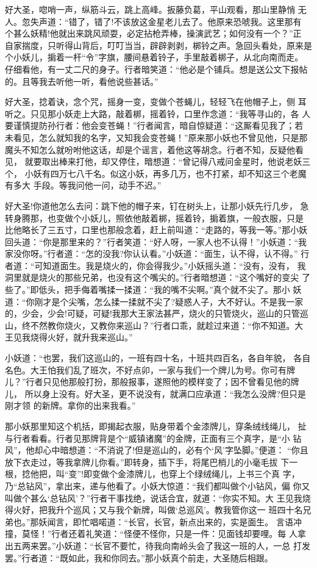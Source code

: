 好大圣，唿哨一声，纵筋斗云，跳上高峰。扳藤负葛，平山观看，那山里静悄
无人。忽失声道：“错了，错了!不该放这金星老儿去了。他原来恐唬我。这里那有
个甚么妖精!他就出来跳风顽耍，必定拈枪弄棒，操演武艺；如何没有一个？”正
自家揣度，只听得山背后，叮叮当当，辟辟剥剥，梆铃之声。急回头看处，原来是
个小妖儿，掮着一杆“令”字旗，腰间悬着铃子，手里敲着梆子，从北向南而走。
仔细看他，有一丈二尺的身子。行者暗笑道：“他必是个铺兵。想是送公文下报帖
的。且等我去听他一听，看他说些甚话。”

好大圣，捻着诀，念个咒，摇身一变，变做个苍蝇儿，轻轻飞在他帽子上，侧
耳听之。只见那小妖走上大路，敲着梆，摇着铃，口里作念道：“我等寻山的，各
人要谨慎提防孙行者：他会变苍蝇！”行者闻言，暗自惊疑道：“这厮看见我了；若
未看见，怎么就知我的名字，又知我会变苍蝇！”原来那小妖也不曾见他，只是那
魔头不知怎么就吩咐他这话，却是个谣言，着他这等胡念。行者不知，反疑他看见，
就要取出棒来打他，却又停住，暗想道：“曾记得八戒问金星时，他说老妖三个，
小妖有四万七八千名。似这小妖，再多几万，也不打紧，却不知这三个老魔有多大
手段。等我问他一问，动手不迟。”

好大圣!你道他怎么去问：跳下他的帽子来，钉在树头上，让那小妖先行几步，
急转身腾那，也变做个小妖儿，照依他敲着梆，摇着铃，掮着旗，一般衣服，只是
比他略长了三五寸，口里也那般念着，赶上前叫道：“走路的，等我一等。”那小妖
回头道：“你是那里来的？”行者笑道：“好人呀，一家人也不认得！”小妖道：“我
家没你呀。”行者道：“怎的没我?你认认看。”小妖道：“面生，认不得，认不得。”
行者道：“可知道面生。我是烧火的，你会得我少。”小妖摇头道：“没有，没有，
我洞里就是烧火的那些兄弟，也没有这个嘴尖的。”行者暗想道：“这个嘴好的变尖
了些了。”即低头，把手侮着嘴揉一揉道：“我的嘴不尖啊。”真个就不尖了。那小
妖道：“你刚才是个尖嘴，怎么揉一揉就不尖了?疑惑人子，大不好认。不是我一家
的，少会，少会!可疑，可疑!我那大王家法甚严，烧火的只管烧火，巡山的只管巡
山，终不然教你烧火，又教你来巡山？”行者口乖，就趁过来道：“你不知道。大
王见我烧得火好，就升我来巡山。”

小妖道：“也罢，我们这巡山的，一班有四十名，十班共四百名，各自年貌，
各自名色。大王怕我们乱了班次，不好点卯，一家与我们一个牌儿为号。你可有牌
儿？”行者只见他那般打扮，那般报事，遂照他的模样变了；因不曾看见他的牌儿，
所以身上没有。好大圣，更不说没有，就满口应承道：“我怎么没牌?但只是刚才领
的新牌。拿你的出来我看。”

那小妖那里知这个机括，即揭起衣服，贴身带着个金漆牌儿，穿条绒线绳儿，
扯与行者看看。行者见那牌背是个“威镇诸魔”的金牌，正面有三个真字，是“小
钻风”，他却心中暗想道：“不消说了!但是巡山的，必有个‘风’字坠脚。”便道：
“你且放下衣走过，等我拿牌儿你看。”即转身，插下手，将尾巴梢儿的小毫毛拔
下一根，捻他把，叫“变”!即变做个金漆牌儿，也穿上个绿绒绳儿，上书三个真
字，乃“总钻风”，拿出来，递与他看了。小妖大惊道：“我们都叫做个小钻风，偏
你又叫做个甚么‘总钻风’？”行者干事找绝，说话合宜，就道：“你实不知。大
王见我烧得火好，把我升个巡风；又与我个新牌，叫做‘总巡风’。教我管你这一
班四十名兄弟也。”那妖闻言，即忙唱喏道：“长官，长官，新点出来的，实是面生。
言语冲撞，莫怪！”行者还着礼笑道：“怪便不怪你，只是一件：见面钱却要哩。每
人拿出五两来罢。”小妖道：“长官不要忙，待我向南岭头会了我这一班的人，一总
打发罢。”行者道：“既如此，我和你同去。”那小妖真个前走，大圣随后相跟。

